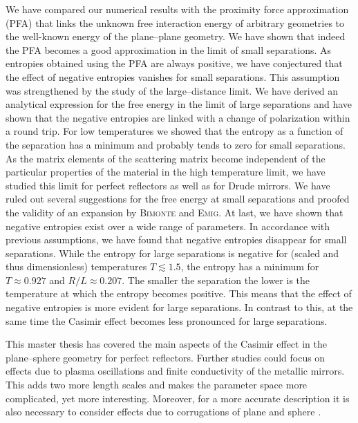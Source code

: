 We have compared our numerical results with the proximity force approximation (PFA)
that links the unknown free interaction energy of arbitrary geometries to the
well-known energy of the plane--plane geometry. We have shown that indeed the
PFA becomes a good approximation in the limit of small separations. As
entropies obtained using the PFA are always positive, we have conjectured that the
effect of negative entropies vanishes for small separations. This assumption
was strengthened by the study of the large--distance limit. We have derived an
analytical expression for the free energy in the limit of large separations and
have shown that the negative entropies are linked with a change of polarization
within a round trip. For low temperatures we showed that the entropy as a
function of the separation has a minimum and probably tends to zero for small
separations. As the matrix elements of the scattering matrix become independent
of the particular properties of the material in the high temperature limit, we
have studied this limit for perfect reflectors as well as for Drude mirrors. We
have ruled out several suggestions for the free energy at small separations and
proofed the validity of an expansion by \textsc{Bimonte} and \textsc{Emig}. At
last, we have shown that negative entropies exist over a wide range of parameters.
In accordance with previous assumptions, we have found that negative entropies
disappear for small separations.  While the entropy for large separations is
negative for (scaled and thus dimensionless) temperatures $T\lesssim1.5$, the
entropy has a minimum for $T\approx0.927$ and $R/L\approx0.207$. The smaller
the separation the lower is the temperature at which the entropy becomes
positive. This means that the effect of negative entropies is more evident for
large separations. In contrast to this, at the same time the Casimir effect
becomes less pronounced for large separations.

This master thesis has covered the main aspects of the Casimir effect in the
plane--sphere geometry for perfect reflectors. Further studies could focus on
effects due to plasma oscillations and finite conductivity of the metallic
mirrors. This adds two more length scales and makes the parameter space more
complicated, yet more interesting. Moreover, for a more accurate description it
is also necessary to consider effects due to corrugations of plane and sphere
\cite{Lambrecht:CasimirScatteringApproach}.
